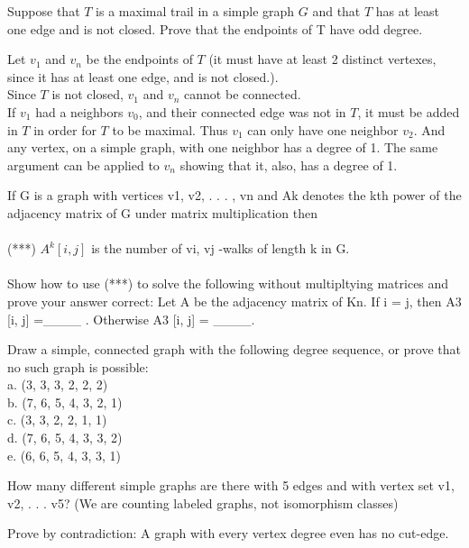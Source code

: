 \documentclass[12pt]{article}
\newenvironment{question}[2][Question]{\begin{trivlist}
\item[\hskip \labelsep {\bfseries #1}\hskip \labelsep {\bfseries #2.}]}{\end{trivlist}}
\begin{document}
\begin{question}{4}
Suppose that $T$ is a maximal trail in a simple graph $G$ and that $T$ has at least one edge and is not closed. Prove that the endpoints of T have odd degree.
\end{question}

Let $v_1$ and $v_n$ be the endpoints of $T$ (it must have at least 2 distinct vertexes, since it has at least one edge, and is not closed.). \\

Since $T$ is not closed, $v_1$ and $v_n$ cannot be connected. \\

If $v_1$ had a neighbors $v_0$, and their connected edge was not in $T$, it must be added in $T$ in order for $T$ to be maximal. Thus $v_1$ can only have one neighbor $v_2$. And any vertex, on a simple graph, with one neighbor has a degree of 1. The same argument can be applied to $v_n$ showing that it, also, has a degree of 1.

\begin{question}{5}
If G is a graph with vertices v1, v2, . . . , vn and Ak denotes the kth power of the adjacency matrix
of G under matrix multiplication then \\ \\
(***) $A^{k}[i, j]$ is the number of vi, vj -walks of length k in G. \\ \\
Show how to use (***) to solve the following without multipltying matrices and prove your answer
correct: Let A be the adjacency matrix of Kn. If i = j, then A3
[i, j] =\_\_\_\_ . Otherwise
A3
[i, j] = \_\_\_\_.
\end{question}

\begin{question}{6}
Draw a simple, connected graph with the following degree sequence, or prove that no such graph
is possible: \\
a. (3, 3, 3, 2, 2, 2) \\
b. (7, 6, 5, 4, 3, 2, 1) \\ 
c. (3, 3, 2, 2, 1, 1) \\
d. (7, 6, 5, 4, 3, 3, 2) \\
e. (6, 6, 5, 4, 3, 3, 1) 
\end{question}

\begin{question}{7}
 How many different simple graphs are there with 5 edges and with vertex set {v1, v2, . . . v5}?
(We are counting labeled graphs, not isomorphism classes)
\end{question}

\begin{question}{8}
Prove by contradiction: A graph with every vertex degree even has no cut-edge.
\end{question}




\end{document}
